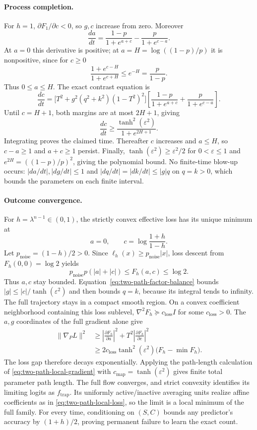 \paragraph{Process completion.}
For $h=1$, $\partial F_1/\partial c<0$, so $g,c$ increase from zero. Moreover
\[
 \frac{da}{dt}=\frac{1-p}{1+e^{a+c}}-\frac{p}{1+e^{c-a}}.
\]
At $a=0$ this derivative is positive; at $a=H=\log((1-p)/p)$ it is nonpositive,
since for $c\ge0$
\[
 \frac{1+e^{c-H}}{1+e^{c+H}}\le e^{-H}=\frac{p}{1-p}.
\]
Thus $0\le a\le H$. The exact contrast equation is
\[
 \frac{dc}{dt}
 =\bigl[T^2+g^2(q^2+k^2)(1-T^2)^2\bigr]
 \left[\frac{1-p}{1+e^{a+c}}+\frac{p}{1+e^{c-a}}\right].
\]
Until $c=H+1$, both margins are at most $2H+1$, giving
\[
 \frac{dc}{dt}\ge\frac{\tanh^2(\varepsilon^2)}{1+e^{2H+1}}.
\]
Integrating proves the claimed time. Thereafter $c$ increases and $a\le H$, so
$c-a\ge1$ and $a+c\ge1$ persist. Finally,
$\tanh(\varepsilon^2)\ge\varepsilon^2/2$ for $0<\varepsilon\le1$ and
$e^{2H}=((1-p)/p)^2$, giving the polynomial bound.
No finite-time blow-up occurs: $|da/dt|,|dg/dt|\le1$ and
$|dq/dt|=|dk/dt|\le |g|q$ on $q=k>0$, which bounds the parameters on each finite interval.

\paragraph{Outcome convergence.}
For $h=\lambda^{n-1}\in(0,1)$, the strictly convex effective loss has its unique
minimum at
\[
 a=0,\qquad c=\log\frac{1+h}{1-h}.
\]
Let $p_{\mathrm{noise}}=(1-h)/2>0$. Since
$\ell_h(x)\ge p_{\mathrm{noise}}|x|$, loss descent from $F_h(0,0)=\log2$ yields
\[
 p_{\mathrm{noise}}p(|a|+|c|)\le F_h(a,c)\le\log2.
\]
Thus $a,c$ stay bounded. Equation~\eqref{eq:two-path-factor-balance} bounds
$|g|\le |c|/\tanh(\varepsilon^2)$ and then bounds $q=k$, because its integral
tends to infinity. The full trajectory stays in a compact smooth region.
On a convex coefficient neighborhood containing this loss sublevel,
$\nabla^2F_h\succeq c_{\mathrm{loss}}I$ for some $c_{\mathrm{loss}}>0$.
The $a,g$ coordinates of the full gradient alone give
\[
\begin{aligned}
 \|\nabla_P L\|^2
 &\ge \left|\frac{\partial F_h}{\partial a}\right|^2
       +T^2\left|\frac{\partial F_h}{\partial c}\right|^2\\
 &\ge 2c_{\mathrm{loss}}\tanh^2(\varepsilon^2)
       \bigl(F_h-\min F_h\bigr).
\end{aligned}
\]
The loss gap therefore decays exponentially. Applying the path-length calculation
of \cref{eq:two-path-local-gradient} with
$c_{\mathrm{map}}=\tanh(\varepsilon^2)$ gives finite total parameter path length.
The full flow converges, and strict convexity identifies its limiting logits as
$f_{\mathrm{trap}}$. Its uniformly active/inactive averaging units realize affine
coefficients as in \cref{eq:two-path-local-loss}, so the limit is a local minimum
of the full family. For every time, conditioning on $(S,C)$ bounds any predictor's
accuracy by $(1+h)/2$, proving permanent failure to learn the exact count.

